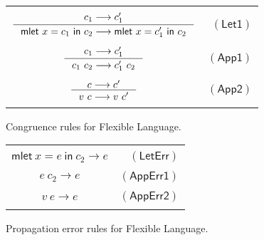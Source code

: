 \documentclass[preprint,authoryear,sort&compress,9pt,nocopyrightspace]{article}
\newcommand\rulename[1]{\mathsf{(#1)}}
\newcommand{\tto}{\longrightarrow}
\newcommand{\oletP}[3]{\mathsf{mlet} \ x = #2 \ \mathsf{in}  \ #3}
\newcommand{\semanticA}{Flexible Language}
\begin{document}
\begin{figure}[h]
\begin{small}
\begin{center}
\begin{tabular}{|c r|}
\hline
&\\
$ \inference {c_1 \tto c_1'}{\oletP{T_1}{c_1}{c_2} \tto \oletP{T_1}{c_1'}{c_2} }$&$\rulename{Let1} $\\
&\\
$\inference {c_1 \tto c_1'}{c_1 \ c_2 \tto c_1' \ c_2} $&$\rulename{App1}  $\\
&\\
$ \inference {c \tto c'}{v \ c \tto v \ c'}$&$\rulename{App2}  $\\
&\\
\hline
\end{tabular}
\caption{Congruence rules for \semanticA.}
\label{tabla:congruenceRules}
\end{center}
\end{small}
\end{figure}

\begin{figure}[h]
\begin{small}
\begin{center}
\begin{tabular}{|c r|}
\hline
&\\
$ {\oletP{T_1}{e}{c_2} \tto e  }$&$\rulename{LetErr} $\\
&\\
${e \ c_2 \tto e} $&$\rulename{AppErr1}  $\\
&\\
$ {v \ e \tto e}$&$\rulename{AppErr2}  $\\
&\\
\hline
\end{tabular}
\caption{Propagation error rules for \semanticA.}
\label{tabla:errorRules}
\end{center}
\end{small}
\end{figure}
\end{document}
